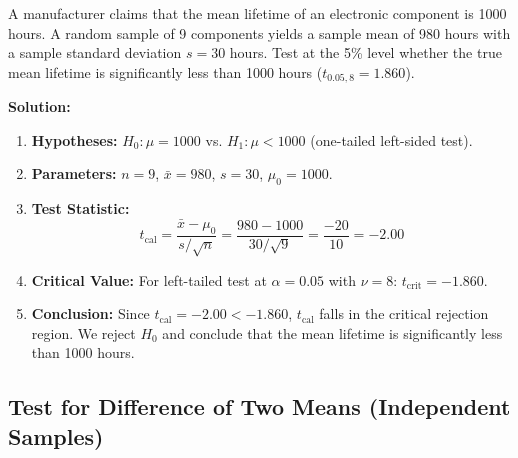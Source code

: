 \documentclass[12pt,a4paper]{article}
\begin{document}
\begin{tcolorbox}[examplebox, title={\textbf{Worked Example: Single Mean $t$-Test}}]
A manufacturer claims that the mean lifetime of an electronic component is 1000 hours. A random sample of 9 components yields a sample mean of 980 hours with a sample standard deviation $s = 30$ hours. Test at the 5\% level whether the true mean lifetime is significantly less than 1000 hours ($t_{0.05, 8} = 1.860$).

\textbf{Solution:}
\begin{enumerate}[leftmargin=14pt, itemsep=2pt]
  \item \textbf{Hypotheses:} $H_0: \mu = 1000$ vs. $H_1: \mu < 1000$ (one-tailed left-sided test).
  \item \textbf{Parameters:} $n = 9$, $\bar{x} = 980$, $s = 30$, $\mu_0 = 1000$.
  \item \textbf{Test Statistic:}
  \begin{equation*}
    t_{\text{cal}} = \frac{\bar{x} - \mu_0}{s / \sqrt{n}} = \frac{980 - 1000}{30 / \sqrt{9}} = \frac{-20}{10} = -2.00
  \end{equation*}
  \item \textbf{Critical Value:} For left-tailed test at $\alpha = 0.05$ with $\nu = 8$: $t_{\text{crit}} = -1.860$.
  \item \textbf{Conclusion:} Since $t_{\text{cal}} = -2.00 < -1.860$, $t_{\text{cal}}$ falls in the critical rejection region. We reject $H_0$ and conclude that the mean lifetime is significantly less than 1000 hours.
\end{enumerate}
\end{tcolorbox}

\subsection{Test for Difference of Two Means (Independent Samples)}
\end{document}

